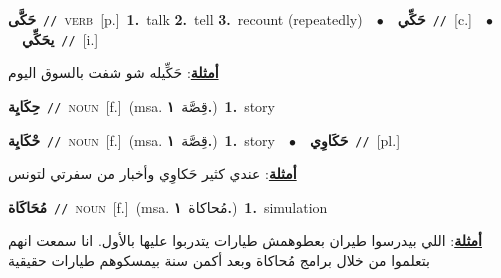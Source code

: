 \documentclass[10pt,a4paper,twoside]{article} %
\begin{document}
\begin{multicols}{2}
{\setlength\topsep{0pt}\textbf{\foreignlanguage{arabic}{حَكَّى}}\ {\color{gray}\texttt{//}\color{black}}\ \textsc{verb}\ [p.]\ \textbf{1.}~talk  \textbf{2.}~tell  \textbf{3.}~recount (repeatedly)\ \ $\bullet$\ \ \setlength\topsep{0pt}\textbf{\foreignlanguage{arabic}{حَكِّي}}\ {\color{gray}\texttt{//}\color{black}}\ [c.]\ \ $\bullet$\ \ \setlength\topsep{0pt}\textbf{\foreignlanguage{arabic}{يحَكِّي}}\ {\color{gray}\texttt{//}\color{black}}\ [i.]\  \begin{flushright}\color{gray}\foreignlanguage{arabic}{\textbf{\underline{\foreignlanguage{arabic}{أمثلة}}}: حَكِّيله شو شفت بالسوق اليوم}\end{flushright}\color{black}} \vspace{2mm}

{\setlength\topsep{0pt}\textbf{\foreignlanguage{arabic}{حِكَايِة}}\ {\color{gray}\texttt{//}\color{black}}\ \textsc{noun}\ [f.]\ \color{gray}(msa. \foreignlanguage{arabic}{قِصَّة}~\foreignlanguage{arabic}{\textbf{١.}})\color{black}\ \textbf{1.}~story\ } \vspace{2mm}

{\setlength\topsep{0pt}\textbf{\foreignlanguage{arabic}{حْكَايِة}}\ {\color{gray}\texttt{//}\color{black}}\ \textsc{noun}\ [f.]\ \color{gray}(msa. \foreignlanguage{arabic}{قِصَّة}~\foreignlanguage{arabic}{\textbf{١.}})\color{black}\ \textbf{1.}~story\ \ $\bullet$\ \ \setlength\topsep{0pt}\textbf{\foreignlanguage{arabic}{حَكَاوِي}}\ {\color{gray}\texttt{//}\color{black}}\ [pl.]\  \begin{flushright}\color{gray}\foreignlanguage{arabic}{\textbf{\underline{\foreignlanguage{arabic}{أمثلة}}}: عندي كثير حَكاوِي وأخبار من سفرتي لتونس}\end{flushright}\color{black}} \vspace{2mm}

{\setlength\topsep{0pt}\textbf{\foreignlanguage{arabic}{مُحَاكَاة}}\ {\color{gray}\texttt{//}\color{black}}\ \textsc{noun}\ [f.]\ \color{gray}(msa. \foreignlanguage{arabic}{مُحاكاة}~\foreignlanguage{arabic}{\textbf{١.}})\color{black}\ \textbf{1.}~simulation\  \begin{flushright}\color{gray}\foreignlanguage{arabic}{\textbf{\underline{\foreignlanguage{arabic}{أمثلة}}}: اللي بيدرسوا طيران بعطوهمش طيارات يتدربوا عليها بالأول. انا سمعت انهم بتعلموا من خلال برامج مُحاكاة وبعد أكمن سنة بيمسكوهم طيارات حقيقية}\end{flushright}\color{black}} \vspace{2mm}


\end{multicols}
\end{document}

